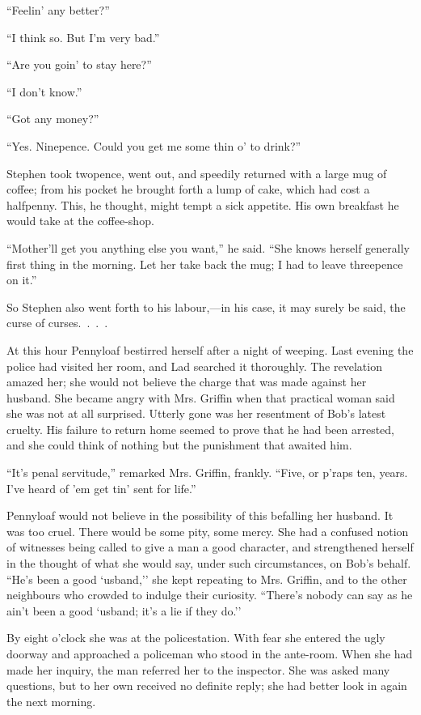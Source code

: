 ``Feelin' any better?''

``I think so. But I'm very bad.''

``Are you goin' to stay here?''

``I don't know.''

``Got any money?''

``Yes. Ninepence. Could you get me some thin o' to drink?''

Stephen took twopence, went out, and speedily returned with a large mug
of coffee; from his pocket he brought forth a lump of cake, which had
cost a halfpenny. This, he thought, might tempt a sick appetite. His own
breakfast he would take at the coffee-shop.

``Mother'll get you anything else you want,'' he said. ``She knows
herself generally first thing in the morning. Let her take back the mug;
I had to leave threepence on it.''

So Stephen also went forth to his labour,---in his case, it may surely
be said, the curse of curses{.~.~.~.}

At this hour Pennyloaf bestirred herself
{\protect\hypertarget{207}{}{}}after a night of weeping. Last evening
the police had visited her room, and Lad searched it thoroughly. The
revelation amazed her; she would not believe the charge that was made
against her husband. She became angry with Mrs. Griffin when that
practical woman said she was not at all surprised. Utterly gone was her
resentment of Bob's latest cruelty. His failure to return home seemed to
prove that he had been arrested, and she could think of nothing but the
punishment that awaited him.

``It's penal servitude,'' remarked Mrs. Griffin, frankly. ``Five, or
p'raps ten, years. I've heard of 'em get tin' sent for life.''

Pennyloaf would not believe in the possibility of this befalling her
husband. It was too cruel. There would be some pity, some mercy. She had
a confused notion of witnesses being called to give a man a good
character, and strengthened herself in the thought of what she would
say, under such circumstances, on Bob's behalf. ``He's been a good
`usband,'' she kept repeating to Mrs. Griffin, and to the other
neighbours who crowded to indulge their curiosity. ``There's nobody can
say as he ain't been a good `usband; it's a lie if they do.''

{\protect\hypertarget{208}{}{}}By eight o'clock she was at the
policestation. With fear she entered the ugly doorway and approached a
policeman who stood in the ante-room. When she had made her inquiry, the
man referred her to the inspector. She was asked many questions, but to
her own received no definite reply; she had better look in again the
next morning.


